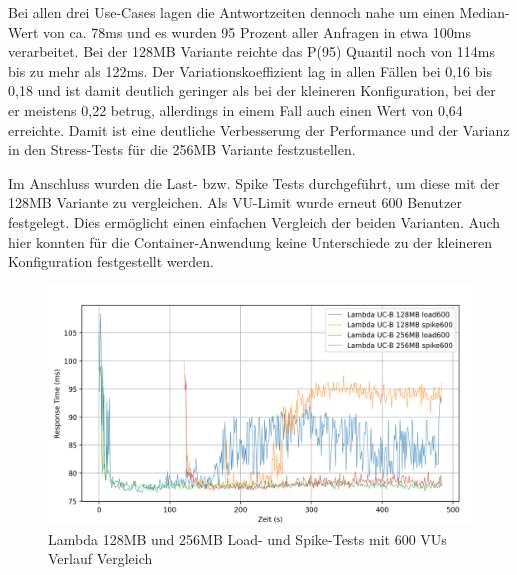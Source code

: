 Bei allen drei Use-Cases lagen die Antwortzeiten dennoch nahe um einen Median-Wert von ca. 78ms und es wurden 95 Prozent aller Anfragen in etwa 100ms verarbeitet. Bei der 128MB Variante reichte das P(95) Quantil noch von 114ms bis zu mehr als 122ms. Der Variationskoeffizient lag in allen Fällen bei 0,16 bis 0,18 und ist damit deutlich geringer als bei der kleineren Konfiguration, bei der er meistens 0,22 betrug, allerdings in einem Fall auch einen Wert von 0,64 erreichte. Damit ist eine deutliche Verbesserung der Performance und der Varianz in den Stress-Tests für die 256MB Variante festzustellen.

Im Anschluss wurden die Last- bzw. Spike Tests durchgeführt, um diese mit der 128MB Variante zu vergleichen. Als \ac{VU}-Limit wurde erneut 600 Benutzer festgelegt. Dies ermöglicht einen einfachen Vergleich der beiden Varianten.
Auch hier konnten für die Container-Anwendung keine Unterschiede zu der kleineren Konfiguration festgestellt werden. 

\begin{figure}[]
    \includegraphics[width=\textwidth]{img/lambda128+256-ucb-load600-vs-spike600-graph.png}
    \caption[Lambda 128MB und 256MB Load- und Spike-Tests mit 600 VUs Verlauf Vergleich]{Lambda 128MB und 256MB Load- und Spike-Tests mit 600 VUs Verlauf Vergleich}
    \label{fig:lambda128+256-ucb-load600-vs-spike600-graph}
\end{figure}

